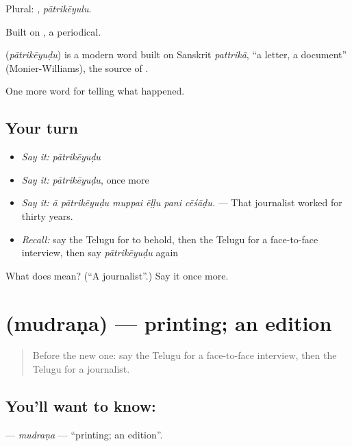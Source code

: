 Plural: , \emph{pātrikēyulu}.

Built on , a periodical.

\begin{cousinweb}
\textbf{} (\emph{pātrikēyuḍu}) is a modern word built on Sanskrit \emph{pattrikā}, \textquotedblleft{}a letter, a document\textquotedblright{} (Monier-Williams), the source of .
\end{cousinweb}

\begin{grammarlens}[title={What you've built}]
One more word for telling what happened.
\end{grammarlens}

\subsection*{Your turn}
\begin{itemize}
\raggedright
  \item \emph{Say it:} \emph{pātrikēyuḍu}
  \item \emph{Say it:} \emph{pātrikēyuḍu}, once more
  \item \emph{Say it:} \emph{ā pātrikēyuḍu muppai ēḷḷu pani cēśāḍu.} — That journalist worked for thirty years.
  \item \emph{Recall:} say the Telugu for to behold, then the Telugu for a face-to-face interview, then say \emph{pātrikēyuḍu} again
\end{itemize}

\begin{tcolorbox}[breakable,colback=teal!4,colframe=teal!35!black,title={Before you move on}]
What does  mean? (\textquotedblleft{}A journalist\textquotedblright{}.) Say it once more.
\end{tcolorbox}
\section[\texorpdfstring{\te{ముద్రణ} (mudraṇa)}{ముద్రణ (mudraṇa)}]{ (mudraṇa) — printing; an edition}

\label{lesson:TE-C375-mudrana}



\begin{quote}
Before the new one: say the Telugu for a face-to-face interview, then the Telugu for a journalist.
\end{quote}

\subsection*{You'll want to know: }
\textbf{} — \emph{mudraṇa} — \textquotedblleft{}printing; an edition\textquotedblright{}.

